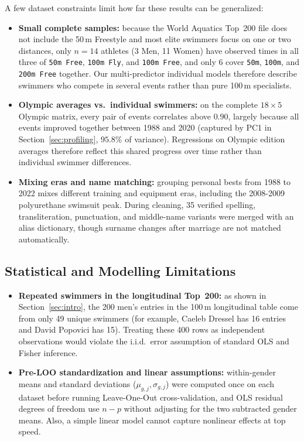 \documentclass[11pt, a4paper]{article}
\begin{document}
A few dataset constraints limit how far these results can be generalized:
\begin{itemize}
    \item \textbf{Small complete samples:} because the World Aquatics Top~200 file does not include the 50\,m Freestyle and most elite swimmers focus on one or two distances, only $n=14$ athletes (3 Men, 11 Women) have observed times in all three of \texttt{50m Free}, \texttt{100m Fly}, and \texttt{100m Free}, and only $6$ cover \texttt{50m}, \texttt{100m}, and \texttt{200m Free} together. Our multi-predictor individual models therefore describe swimmers who compete in several events rather than pure 100\,m specialists.

    \item \textbf{Olympic averages vs.\ individual swimmers:} on the complete $18 \times 5$ Olympic matrix, every pair of events correlates above $0.90$, largely because all events improved together between 1988 and 2020 (captured by PC1 in Section~\ref{sec:profiling}, $95.8\%$ of variance). Regressions on Olympic edition averages therefore reflect this shared progress over time rather than individual swimmer differences.

    \item \textbf{Mixing eras and name matching:} grouping personal bests from 1988 to 2022 mixes different training and equipment eras, including the 2008-2009 polyurethane swimsuit peak. During cleaning, 35 verified spelling, transliteration, punctuation, and middle-name variants were merged with an alias dictionary, though surname changes after marriage are not matched automatically.
\end{itemize}

\subsection{Statistical and Modelling Limitations}

\begin{itemize}
    \item \textbf{Repeated swimmers in the longitudinal Top~200:} as shown in Section~\ref{sec:intro}, the 200 men's entries in the 100\,m longitudinal table come from only 49 unique swimmers (for example, Caeleb Dressel has 16 entries and David Popovici has 15). Treating these 400 rows as independent observations would violate the i.i.d.\ error assumption of standard OLS and Fisher inference.

    \item \textbf{Pre-LOO standardization and linear assumptions:} within-gender means and standard deviations ($\mu_{g,j}, \sigma_{g,j}$) were computed once on each dataset before running Leave-One-Out cross-validation, and OLS residual degrees of freedom use $n - p$ without adjusting for the two subtracted gender means. Also, a simple linear model cannot capture nonlinear effects at top speed.
\end{itemize}
\end{document}
